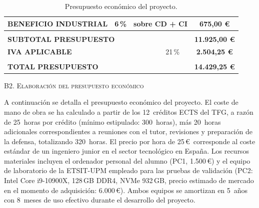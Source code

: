 \begin{table}[H]
{\begin{tabular}{lllllc}
\multicolumn{1}{|l|}{\textbf{BENEFICIO INDUSTRIAL}} &
\multicolumn{1}{c|}{6\,\%} &
\multicolumn{3}{c|}{sobre CD + CI} &
\multicolumn{1}{c|}{\textbf{675,00 \euro}} \\
\hline

& & & & &
\multicolumn{1}{l}{} \\
\hline

\multicolumn{5}{|l|}{\textbf{SUBTOTAL PRESUPUESTO}} &
\multicolumn{1}{c|}{\textbf{11.925,00 \euro}} \\
\hline

\multicolumn{4}{|l|}{\textbf{IVA APLICABLE}} &
\multicolumn{1}{c|}{21\,\%} &
\multicolumn{1}{c|}{\textbf{2.504,25 \euro}} \\
\hline

& & & & &
\multicolumn{1}{l}{} \\
\hline

\multicolumn{5}{|l|}{\textbf{TOTAL PRESUPUESTO}} &
\multicolumn{1}{c|}{\textbf{14.429,25 \euro}} \\
\hline

\end{tabular}}
    \caption{Presupuesto económico del proyecto.}
    \label{presupuesto-economico}

\end{table}

\vspace{0.5cm}

\Large{\textsc{\textcolor{nar}{B2. Elaboración del presupuesto económico}}}
\vspace{0.2cm}

\normalsize{A continuación se detalla el presupuesto económico del proyecto. El coste de mano de obra se ha calculado a partir de los 12~créditos ECTS del TFG, a razón de 25~horas por crédito (mínimo estipulado: 300~horas), más 20~horas adicionales correspondientes a reuniones con el tutor, revisiones y preparación de la defensa, totalizando 320~horas. El precio por hora de 25\,\euro\ corresponde al coste estándar de un ingeniero junior en el sector tecnológico en España. Los recursos materiales incluyen el ordenador personal del alumno (PC1, 1.500\,\euro) y el equipo de laboratorio de la \ac{ETSIT}-UPM empleado para las pruebas de validación (PC2: Intel Core i9-10900X, 128\,GB DDR4, NVMe 932\,GB, precio estimado de mercado en el momento de adquisición: 6.000\,\euro). Ambos equipos se amortizan en 5~años con 8~meses de uso efectivo durante el desarrollo del proyecto.}
